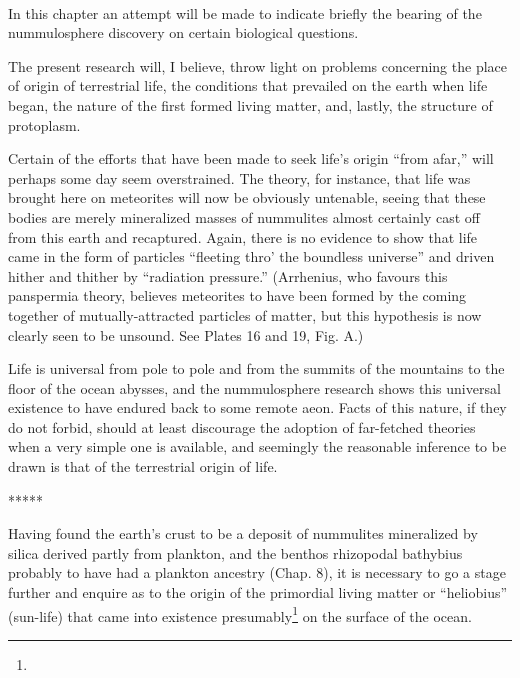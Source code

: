\documentclass[a4paper, 12pt, oneside]{article}
\begin{document}
\paragraph{}
In this chapter an attempt will be made to indicate briefly the bearing of the nummulosphere discovery on certain biological questions.

The present research will, I believe, throw light on problems concerning the place of origin of terrestrial life, the conditions that prevailed on the earth when life began, the nature of the first formed living matter, and, lastly, the structure of protoplasm.

Certain of the efforts that have been made to seek life's origin ``from afar,'' will perhaps some day seem overstrained. The theory, for instance, that life was brought here on meteorites will now be obviously untenable, seeing that these bodies are merely mineralized masses of nummulites almost certainly cast off from this earth and recaptured. Again, there is no evidence to show that life came in the form of particles ``fleeting thro' the boundless universe'' and driven hither and thither by ``radiation pressure.'' (Arrhenius, who favours this panspermia theory, believes meteorites to have been formed by the coming together of mutually-attracted particles of matter, but this hypothesis is now clearly seen to be unsound. See Plates 16 and 19, Fig. A.)

Life is universal from pole to pole and from the summits of the mountains to the floor of the ocean abysses, and the nummulosphere research shows this universal existence to have endured back to some remote aeon. Facts of this nature, if they do not forbid, should at least discourage the adoption of far-fetched theories when a very simple one is available, and seemingly the reasonable inference to be drawn is that of the terrestrial origin of life.

\centerline{*\hspace{15mm}*\hspace{15mm}*\hspace{15mm}*\hspace{15mm}*}
\bigskip

Having found the earth's crust to be a deposit of nummulites mineralized by silica derived partly from plankton, and the benthos rhizopodal bathybius probably to have had a plankton ancestry (Chap. 8), it is necessary to go a stage further and enquire as to the origin of the primordial living matter or ``heliobius'' (sun-life) that came into existence presumably\footnote{} on the surface of the ocean.
\end{document}
